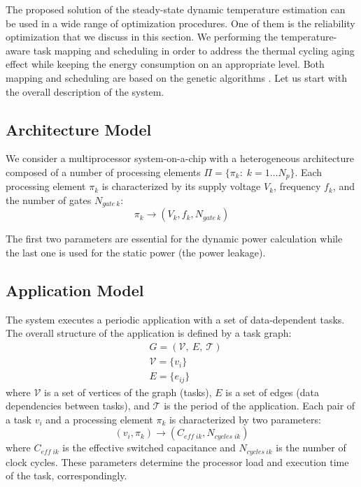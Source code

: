 The proposed solution of the steady-state dynamic temperature estimation can be used in a wide range of optimization procedures. One of them is the reliability optimization that we discuss in this section. We performing the temperature-aware task mapping and scheduling in order to address the thermal cycling aging effect while keeping the energy consumption on an appropriate level. Both mapping and scheduling are based on the genetic algorithms \cite{schmitz2004}. Let us start with the overall description of the system.

\subsection{Architecture Model}
We consider a multiprocessor system-on-a-chip with a heterogeneous architecture composed of a number of processing elements $\Pi = \{ \pi_k: \; k = 1 \dots N_p \}$. Each processing element $\pi_k$ is characterized by its supply voltage $V_k$, frequency $f_k$, and the number of gates $N_{gate \: k}$:
\[
  \pi_k \rightarrow (V_k, f_k, N_{gate \: k})
\]

The first two parameters are essential for the dynamic power calculation while the last one is used for the static power (the power leakage).

\subsection{Application Model}
The system executes a periodic application with a set of data-dependent tasks. The overall structure of the application is defined by a task graph:
\begin{align*}
  & G = (\mathcal{V}, \: E, \: \mathcal{T}) \\
  & \mathcal{V} = \{ v_i \} \\
  & E = \{ e_{ij} \}
\end{align*}
where $\mathcal{V}$ is a set of vertices of the graph (tasks), $E$ is a set of edges (data dependencies between tasks), and $\mathcal{T}$ is the period of the application. Each pair of a task $v_i$ and a processing element $\pi_k$ is characterized by two parameters:
\begin{equation*}
  (v_i, \pi_k) \rightarrow (C_{eff \; ik}, N_{cycles \; ik})
\end{equation*}
where $C_{eff \; ik}$ is the effective switched capacitance and $N_{cycles \: ik}$ is the number of clock cycles. These parameters determine the processor load and execution time of the task, correspondingly.

